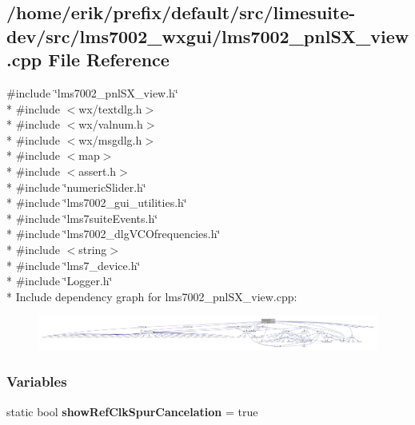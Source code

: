 \subsection{/home/erik/prefix/default/src/limesuite-\/dev/src/lms7002\+\_\+wxgui/lms7002\+\_\+pnl\+S\+X\+\_\+view.cpp File Reference}
\label{lms7002__pnlSX__view_8cpp}
{\ttfamily \#include \char`\"{}lms7002\+\_\+pnl\+S\+X\+\_\+view.\+h\char`\"{}}\\*
{\ttfamily \#include $<$wx/textdlg.\+h$>$}\\*
{\ttfamily \#include $<$wx/valnum.\+h$>$}\\*
{\ttfamily \#include $<$wx/msgdlg.\+h$>$}\\*
{\ttfamily \#include $<$map$>$}\\*
{\ttfamily \#include $<$assert.\+h$>$}\\*
{\ttfamily \#include \char`\"{}numeric\+Slider.\+h\char`\"{}}\\*
{\ttfamily \#include \char`\"{}lms7002\+\_\+gui\+\_\+utilities.\+h\char`\"{}}\\*
{\ttfamily \#include \char`\"{}lms7suite\+Events.\+h\char`\"{}}\\*
{\ttfamily \#include \char`\"{}lms7002\+\_\+dlg\+V\+C\+Ofrequencies.\+h\char`\"{}}\\*
{\ttfamily \#include $<$string$>$}\\*
{\ttfamily \#include \char`\"{}lms7\+\_\+device.\+h\char`\"{}}\\*
{\ttfamily \#include \char`\"{}Logger.\+h\char`\"{}}\\*
Include dependency graph for lms7002\+\_\+pnl\+S\+X\+\_\+view.\+cpp\+:
\nopagebreak
\begin{figure}[H]
\begin{center}
\leavevmode
\includegraphics[width=350pt]{d8/d01/lms7002__pnlSX__view_8cpp__incl}
\end{center}
\end{figure}
\subsubsection*{Variables}
\begin{DoxyCompactItemize}
\item 
static bool {\bf show\+Ref\+Clk\+Spur\+Cancelation} = true
\end{DoxyCompactItemize}


